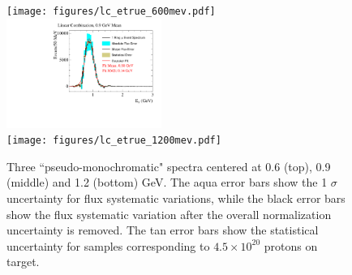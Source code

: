 \begin{figure}[htpb]
\texttt{[image: figures/lc\_etrue\_600mev.pdf]} \\
\includegraphics[width=0.45\textwidth]{figures/lc_etrue_900mev.pdf} \\
\texttt{[image: figures/lc\_etrue\_1200mev.pdf]} 
\caption{Three ``pseudo-monochromatic" spectra centered at 0.6 (top), 0.9 (middle) and 1.2 (bottom) GeV.  The aqua error bars show
the 1 $\sigma$ uncertainty for flux systematic variations, while the black error bars show the flux systematic variation after the
overall normalization uncertainty is removed.  The tan error bars show the statistical uncertainty for samples corresponding to 
 $4.5\times10^{20}$ protons on target.  }
\label{fig:mono_beam}
\end{figure}






